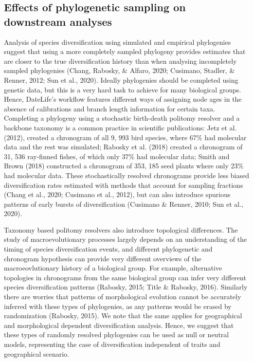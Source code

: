\documentclass[english,man]{apa6}
\begin{document}
\hypertarget{effects-of-phylogenetic-sampling-on-downstream-analyses}{%
\subsection{Effects of phylogenetic sampling on downstream analyses}\label{effects-of-phylogenetic-sampling-on-downstream-analyses}}

Analysis of species diversification using simulated and empirical phylogenies suggest that using a more completely sampled phylogeny provides estimates that are closer to the true diversification history than when analysing incompletely sampled phylogenies (Chang, Rabosky, \& Alfaro, 2020; Cusimano, Stadler, \& Renner, 2012; Sun et al., 2020).
Ideally phylogenies should be completed using genetic data, but this is a very hard task to achieve for many biological groups.
Hence, DateLife's workflow features different ways of assigning node ages in the absence of calibrations and branch length information for certain taxa.
Completing a phylogeny using a stochastic birth-death politomy resolver and a backbone taxonomy is a common practice in scientific publications: Jetz et al. (2012), created a chronogram of all 9, 993 bird species, where 67\% had molecular data and the rest was simulated; Rabosky et al. (2018) created a chronogram of 31, 536 ray-finned fishes, of which only 37\% had molecular data; Smith and Brown (2018) constructed a chronogram of 353, 185 seed plants where only 23\% had molecular data. These stochastically resolved chronograms provide less biased diversification rates estimated with methods that account for sampling fractions (Chang et al., 2020; Cusimano et al., 2012), but can also introduce spurious patterns of early bursts of diversification (Cusimano \& Renner, 2010; Sun et al., 2020).

Taxonomy based politomy resolvers also introduce topological differences.
The study of macroevolutionary processes largely depends on an understanding of the timing of species diversification events, and different phylogenetic and chronogram hypothesis can provide very different overviews of the macroeovlutionary history of a biological group.
For example, alternative topologies in chronograms from the same biological group can infer very different species diversification patterns (Rabosky, 2015; Title \& Rabosky, 2016).
Similarly there are worries that patterns of morphological evolution cannot be accurately inferred with these types of phylogenies, as any patterns would be erased by randomization (Rabosky, 2015). We note that the same applies for geographical and morphological dependent diversification analysis. Hence, we suggest that these types of randomly resolved phylogenies can be used as null or neutral models, representing the case of diversification independent of traits and geographical scenario.
\end{document}
